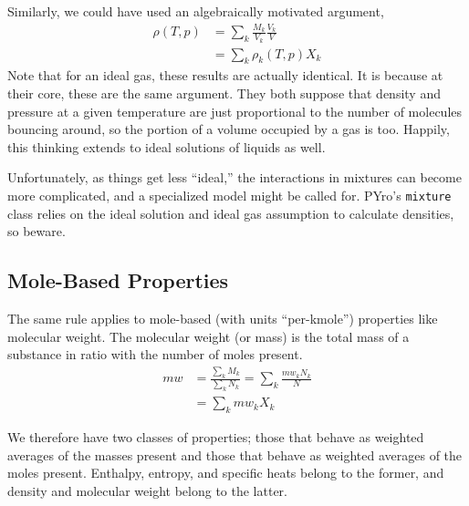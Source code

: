 Similarly, we could have used an algebraically motivated argument,
\begin{align}
\rho(T,p) &= \sum_k \frac{M_k}{V_k}\frac{V_k}{V}\nonumber\\
 &= \sum_k \rho_k(T,p) X_k
\end{align}
Note that for an ideal gas, these results are actually identical.  It is because at their core, these are the same argument.  They both suppose that density and pressure at a given temperature are just proportional to the number of molecules bouncing around, so the portion of a volume occupied by a gas is too.  Happily, this thinking extends to ideal solutions of liquids as well.

Unfortunately, as things get less ``ideal,'' the interactions in mixtures can become more complicated, and a specialized model might be called for.  PYro's \verb|mixture| class relies on the ideal solution and ideal gas assumption to calculate densities, so beware.

\subsection{Mole-Based Properties}
The same rule applies to mole-based (with units ``per-kmole'') properties like molecular weight.  The molecular weight (or mass) is the total mass of a substance in ratio with the number of moles present.
\begin{align}
mw &= \frac{\sum_k M_k}{\sum_k N_k} = \sum_k \frac{mw_k N_k}{N}\nonumber\\
 &= \sum_k mw_k X_k
\end{align}

We therefore have two classes of properties; those that behave as weighted averages of the masses present and those that behave as weighted averages of the moles present.  Enthalpy, entropy, and specific heats belong to the former, and density and molecular weight belong to the latter.
